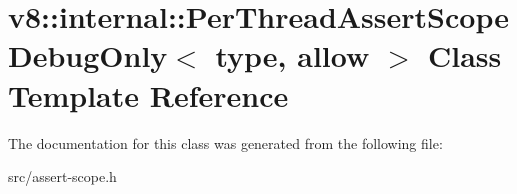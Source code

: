 \hypertarget{classv8_1_1internal_1_1_per_thread_assert_scope_debug_only}{}\section{v8\+:\+:internal\+:\+:Per\+Thread\+Assert\+Scope\+Debug\+Only$<$ type, allow $>$ Class Template Reference}
\label{classv8_1_1internal_1_1_per_thread_assert_scope_debug_only}


The documentation for this class was generated from the following file\+:\begin{DoxyCompactItemize}
\item 
src/assert-\/scope.\+h\end{DoxyCompactItemize}
